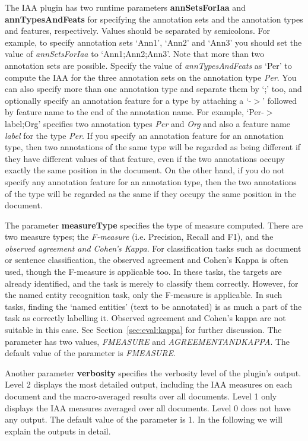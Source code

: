 The IAA plugin has two runtime parameters {\bf annSetsForIaa} and {\bf
annTypesAndFeats} for specifying the annotation sets and the annotation types and
features, respectively. Values should be separated by semicolons. For example, to
specify annotation sets `Ann1', `Ann2' and `Ann3' you should set the value of
{\em annSetsForIaa} to `Ann1;Ann2;Ann3'. Note that more than two annotation sets
are possible. Specify the value of {\em annTypesAndFeats} as `Per' to compute the
IAA for the three annotation sets on the annotation type {\em Per}. You can also
specify more than one annotation type and separate them by `;' too, and
optionally specify an annotation feature for a type by attaching a `-$>$'
followed by feature name to the end of the annotation name.  For example,
`Per-$>$label;Org' specifies two annotation types {\em Per} and {\em Org} and
also a feature name {\em label} for the type {\em Per}. If you specify an
annotation feature for an annotation type, then two annotations of the same type
will be regarded as being different if they have different values of that
feature, even if the two annotations occupy exactly the same position in the
document. On the other hand, if you do not specify any annotation feature for an
annotation type, then the two annotations of the type will be regarded as the
same if they occupy the same position in the document.

The parameter {\bf measureType} specifies the type of measure computed. There are
two measure types; the {\em F-measure} (i.e. Precision, Recall and F1), and the
{\em observed agreement and Cohen's Kappa}.  For classification tasks such as
document or sentence classification, the observed agreement and Cohen's Kappa is
often used, though the F-measure is applicable too. In these tasks, the targets
are already identified, and the task is merely to classify them correctly.
However, for the named entity recognition task, only the F-measure is applicable.
In such tasks, finding the `named entities' (text to be annotated) is as much a
part of the task as correctly labelling it. Observed agreement and Cohen's kappa
are not suitable in this case. See Section~\ref{sec:eval:kappa} for further
discussion. The parameter has two values, {\em FMEASURE} and {\em
AGREEMENTANDKAPPA}. The default value of the parameter is {\em FMEASURE}.

Another parameter {\bf verbosity} specifies the verbosity level of the
plugin's output. Level 2 displays the most detailed output, including
the IAA measures on each document and the macro-averaged results over
all documents.  Level 1 only displays the IAA measures averaged over
all documents.  Level 0 does not have any output. The default value of
the parameter is 1.  In the following we will explain the outputs in
detail.

